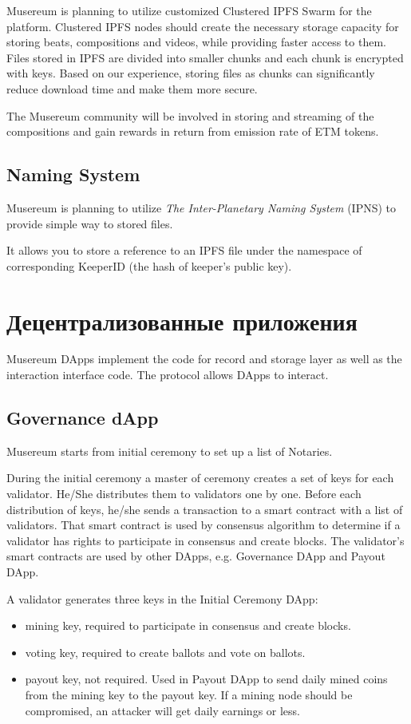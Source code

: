 \documentclass[12pt]{report}
\begin{document}
Musereum is planning to utilize customized Clustered IPFS Swarm for the platform. Clustered IPFS nodes should create the necessary storage capacity for storing beats, compositions and videos, while providing faster access to them. Files stored in IPFS are divided into smaller chunks and each chunk is encrypted with keys. Based on our experience, storing files as chunks can significantly reduce download time and make them more secure.

The Musereum community will be involved in storing and streaming of the compositions and gain rewards in return from emission rate of ETM tokens.
\subsection{Naming System}
\label{tech-storage-naming}
Musereum is planning to utilize \textit{The Inter-Planetary Naming System} (IPNS) to provide simple way to stored files. 

It allows you to store a reference to an IPFS file under the namespace of corresponding KeeperID (the hash of keeper's public key).

\section{Децентрализованные приложения}
\label{tech-apps}
Musereum DApps implement the code for record and storage layer as well as the interaction interface code. The protocol allows DApps to interact.

\subsection{Governance dApp}
\label{tech-apps-governance}
Musereum starts from initial ceremony to set up a list of Notaries.

During the initial ceremony a master of ceremony creates a set of keys for each validator. He/She distributes them to validators one by one. Before each distribution of keys, he/she sends a transaction to a smart contract with a list of validators. That smart contract is used by consensus algorithm to determine if a validator has rights to participate in consensus and create blocks. The validator’s smart contracts are used by other DApps, e.g. Governance DApp and Payout DApp.

A validator generates three keys in the Initial Ceremony DApp:
\begin{itemize}
	\item mining key, required to participate in consensus and create blocks.
	\item voting key, required to create ballots and vote on ballots.
	\item payout key, not required. Used in Payout DApp to send daily mined coins from the mining key to the payout key. If a mining node should be compromised, an attacker will get daily earnings or less.
\end{itemize}
\end{document}

